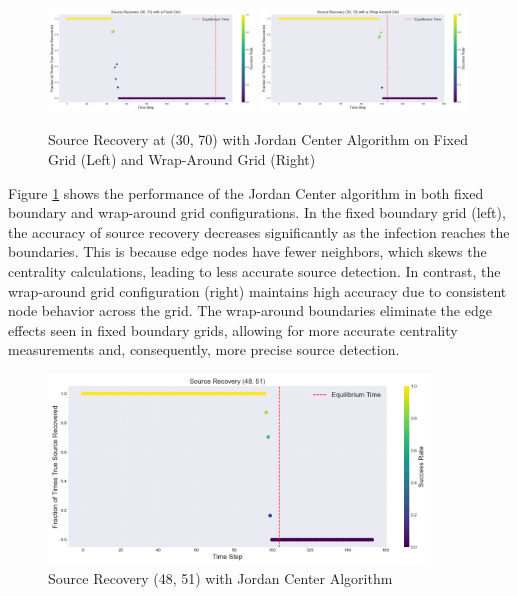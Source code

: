 \begin{figure}[H]
\centering
\includegraphics[width=0.49\textwidth]{img/source_recovery_30_70_Fixed_Grid.png}
\includegraphics[width=0.49\textwidth]{img/source_recovery_30_70_Wrap_Around_Grid.png}
\caption{Source Recovery at (30, 70) with Jordan Center Algorithm on Fixed Grid (Left) and Wrap-Around Grid (Right)}
\label{handling_boundaries_jordan_center}
\end{figure}

Figure \ref{handling_boundaries_jordan_center} shows the performance of the Jordan Center algorithm in both fixed boundary and wrap-around grid configurations. In the fixed boundary grid (left), the accuracy of source recovery decreases significantly as the infection reaches the boundaries. This is because edge nodes have fewer neighbors, which skews the centrality calculations, leading to less accurate source detection. In contrast, the wrap-around grid configuration (right) maintains high accuracy due to consistent node behavior across the grid. The wrap-around boundaries eliminate the edge effects seen in fixed boundary grids, allowing for more accurate centrality measurements and, consequently, more precise source detection.

\begin{figure}[H]
\centering
\includegraphics[width=0.9\textwidth]{img/source_recovery_48_51.png}
\caption{Source Recovery (48, 51) with Jordan Center Algorithm}
\label{source_recovery_central_node_jordan_center}
\end{figure}

